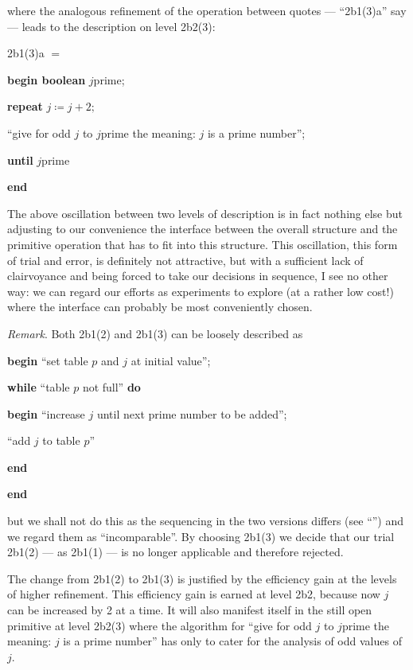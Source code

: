 \noindent
where the analogous refinement of the operation between quotes --- ``2b1(3)a'' say --- leads to the description on level 2b2(3):

\noindent
2b1(3)a $=$

\noindent
\textbf{begin boolean} $j$prime;

\noindent
\quad\textbf{repeat} $j \coloneq j + 2;$

\noindent
\quad\quad``give for odd $j$ to $j$prime the meaning: $j$ is a prime number'';

\noindent
\quad\textbf{until} $j$prime

\noindent
\textbf{end}

The above oscillation between two levels of description is in fact nothing else but adjusting to our convenience the interface between the overall structure and the primitive operation that has to fit into this structure. This oscillation, this form of trial and error, is definitely not attractive, but with a sufficient lack of clairvoyance and being forced to take our decisions in
sequence, I see no other way: we can regard our efforts as experiments to explore (at a rather low cost!) where the interface can probably be most conveniently chosen.

\noindent
\textit{Remark}. Both 2b1(2) and 2b1(3) can be loosely described as

\noindent
\textbf{begin} ``set table $p$ and $j$ at initial value'';

\noindent
\quad\textbf{while} ``table $p$ not full'' \textbf{do}

\noindent
\quad\textbf{begin} ``increase $j$ until next prime number to be added'';

\noindent
\quad\quad ``add $j$ to table $p$''

\noindent
\quad\textbf{end}

\noindent
\textbf{end}

\noindent
but we shall not do this as the sequencing in the two versions differs (see ``'') and we regard them as ``incomparable''. By choosing 2b1(3) we decide that our trial 2b1(2) --- as 2b1(1) --- is no longer applicable and therefore rejected.

The change from 2b1(2) to 2b1(3) is justified by the efficiency gain at the levels of higher refinement. This efficiency gain is earned at level 2b2, because now $j$ can be increased by 2 at a time. It will also manifest itself in the still open primitive at level 2b2(3) where the algorithm for ``give for odd $j$ to $j$prime the meaning: $j$ is a prime number'' has only to cater for the analysis of odd values of $j$.

